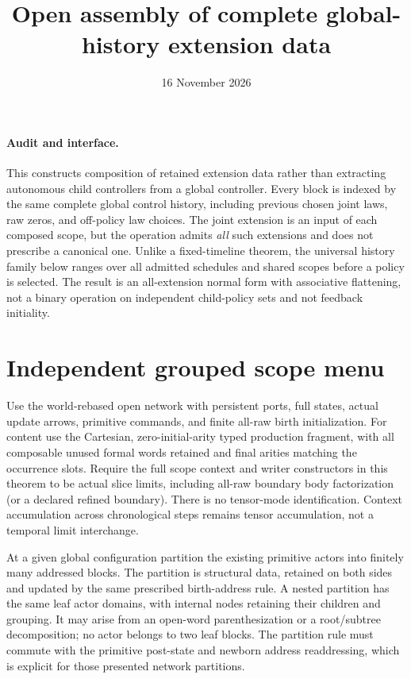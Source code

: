 \documentclass[11pt]{article}
\title{Open assembly of complete global-history extension data}
\date{16 November 2026}
\begin{document}
\maketitle
\paragraph{Audit and interface.}
This constructs composition of retained extension data rather than extracting autonomous child controllers from a global controller. Every block is indexed by the same complete global control history, including previous chosen joint laws, raw zeros, and off-policy law choices. The joint extension is an input of each composed scope, but the operation admits \emph{all} such extensions and does not prescribe a canonical one. Unlike a fixed-timeline theorem, the universal history family below ranges over all admitted schedules and shared scopes before a policy is selected. The result is an all-extension normal form with associative flattening, not a binary operation on independent child-policy sets and not feedback initiality.

\section{Independent grouped scope menu}
Use the world-rebased open network with persistent ports, full states, actual update arrows, primitive commands, and finite all-raw birth initialization. For content use the Cartesian, zero-initial-arity typed production fragment, with all composable unused formal words retained and final arities matching the occurrence slots. Require the full scope context and writer constructors in this theorem to be actual slice limits, including all-raw boundary body factorization (or a declared refined boundary). There is no tensor-mode identification. Context accumulation across chronological steps remains tensor accumulation, not a temporal limit interchange.

At a given global configuration partition the existing primitive actors into finitely many addressed blocks. The partition is structural data, retained on both sides and updated by the same prescribed birth-address rule. A nested partition has the same leaf actor domains, with internal nodes retaining their children and grouping. It may arise from an open-word parenthesization or a root/subtree decomposition; no actor belongs to two leaf blocks. The partition rule must commute with the primitive post-state and newborn address readdressing, which is explicit for those presented network partitions.
\end{document}
